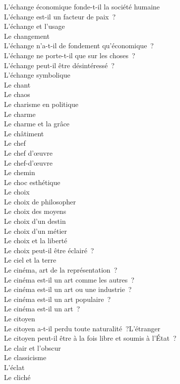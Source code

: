 \documentclass[a4paper,12pt]{article}
\begin{document}
L'échange économique fonde-t-il la société humaine \\
L'échange est-il un facteur de paix ? \\
L'échange et l'usage \\
Le changement \\
L'échange n'a-t-il de fondement qu'économique ? \\
L'échange ne porte-t-il que sur les choses ? \\
L'échange peut-il être désintéressé ? \\
L'échange symbolique \\
Le chant \\
Le chaos \\
Le charisme en politique \\
Le charme \\
Le charme et la grâce \\
Le châtiment \\
Le chef \\
Le chef d'œuvre \\
Le chef-d'œuvre \\
Le chemin \\
Le choc esthétique \\
Le choix \\
Le choix de philosopher \\
Le choix des moyens \\
Le choix d'un destin \\
Le choix d'un métier \\
Le choix et la liberté \\
Le choix peut-il être éclairé ? \\
Le ciel et la terre \\
Le cinéma, art de la représentation ? \\
Le cinéma est-il un art comme les autres ? \\
Le cinéma est-il un art ou une industrie ? \\
Le cinéma est-il un art populaire ? \\
Le cinéma est-il un art ? \\
Le citoyen \\
Le citoyen a-t-il perdu toute naturalité ?L'étranger \\
Le citoyen peut-il être à la fois libre et soumis à l'État ? \\
Le clair et l'obscur \\
Le classicisme \\
L'éclat \\
Le cliché \\
\end{document}
